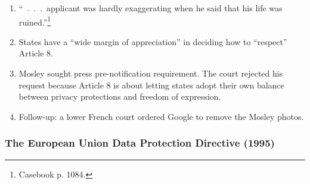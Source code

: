 \begin{enumerate}
    \item ``~.~.~.~applicant was hardly exaggerating when he said that his life 
    was ruined.''\footnote{Casebook p. 1084.}
    \item States have a ``wide margin of appreciation'' in deciding how to 
    ``respect'' Article 8.
    \item Mosley sought press pre-notification requirement. The court rejected 
    his request because Article 8 is about letting states adopt their own 
    balance between privacy protections and freedom of expression.
    \item Follow-up: a lower French court ordered Google to remove the Mosley 
    photos.
\end{enumerate}

\subsubsection{The European Union Data Protection Directive (1995)}

